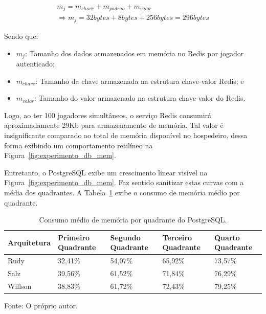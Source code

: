 \begin{multline}
m_j = m_{chave} + m_{padrao} + m_{valor} \\
\Rightarrow m_j = 32bytes + 8bytes + 256bytes = 296bytes
\end{multline}

Sendo que:

\begin{itemize}
\item $m_j$: Tamanho dos dados armazenados em memória no Redis por jogador autenticado;
\item $m_{chave}$: Tamanho da chave armazenada na estrutura chave-valor Redis; e
\item $m_{valor}$: Tamanho do valor armazenado na estrutura chave-valor do Redis.
\end{itemize}


Logo, ao ter 100 jogadores simultâneos, o serviço Redis consumirá aproximadamente 29Kb para armazenamento de memória.
%
Tal valor é insignificante comparado ao total de memória disponível no hospedeiro, dessa forma exibindo um comportamento retilíneo na Figura~\ref{fig:experimento_db_mem}.

Entretanto, o PostgreSQL exibe um crescimento linear visível na Figura~\ref{fig:experimento_db_mem}.
%
Faz sentido sanitizar estas curvas com a média dos quadrantes.
%
A Tabela~\ref{tab:mem_db_media_quadrantes} exibe o consumo de memória médio por quadrante.

\begin{table}[htb!]
\centering
\begin{adjustbox}{max width=\textwidth}
\caption{Consumo médio de memória por quadrante do PostgreSQL.}
\label{tab:mem_db_media_quadrantes}

\begin{tabular}{l|l|l|l|l}
\hline \hline
Arquitetura & Primeiro Quadrante & Segundo Quadrante & Terceiro Quadrante & Quarto Quadrante \\ \hline \hline
Rudy        & 32,41\%            & 54,07\%           & 65,92\%            & 73,57\%          \\ \hline
Salz        & 39,56\%            & 61,52\%           & 71,84\%            & 76,29\%          \\ \hline
Willson     & 38,83\%            & 61,72\%           & 72,43\%            & 79,25\%          \\ \hline \hline
\end{tabular}
\end{adjustbox}

Fonte: O próprio autor.
\end{table}

